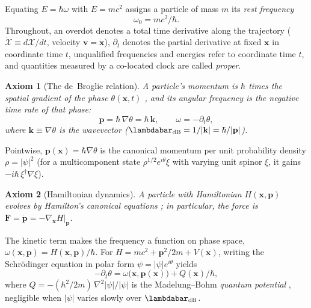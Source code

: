 \documentclass[aps,prd,onecolumn,tightenlines,nofootinbib,notitlepage,10pt,floatfix]{revtex4-2}
\theoremstyle{indentedtheorem}
\newtheorem{axiom}{Axiom}
\begin{document}
\noindent Equating $E=\hbar\omega$ with $E=mc^2$ \citep{Einstein1905Inertia} assigns a particle of mass $m$ its \emph{rest frequency}
\begin{equation}
    \omega_0 = mc^2/\hbar .
    \label{eq:rest_freq}
\end{equation}
Throughout, an overdot denotes a total time derivative along the trajectory ($\dot{\mathcal{X}}\equiv d\mathcal{X}/dt$, velocity $\mathbf{v}=\dot{\mathbf{x}}$), $\partial_t$ denotes the partial derivative at fixed $\mathbf{x}$ in coordinate time $t$, unqualified frequencies and energies refer to coordinate time $t$, and quantities measured by a co-located clock are called \emph{proper}.

\begin{axiom}[The de~Broglie relation]\label{ax:debroglie}
A particle's momentum is $\hbar$ times the spatial gradient of the phase $\theta(\mathbf{x},t)$ \citep{deBroglie1925Thesis}, and its angular frequency is the negative time rate of that phase:
\begin{equation}
    \mathbf{p} = \hbar \, \nabla\theta = \hbar\,\mathbf{k} , \qquad \omega = -\partial_t\theta ,
    \label{eq:debroglie}
\end{equation}
where $\mathbf{k}\equiv\nabla\theta$ is the wavevector ($\lambdabar_\mathrm{dB}=1/|\mathbf{k}|=\hbar/|\mathbf{p}|$).
\end{axiom}

\noindent Pointwise, $\mathbf{p}(\mathbf{x})=\hbar\nabla\theta$ is the canonical momentum per unit probability density $\rho=|\psi|^2$ (for a multicomponent state $\rho^{1/2}e^{i\theta}\xi$ with varying unit spinor $\xi$, it gains $-i\hbar\,\xi^\dagger\nabla\xi$).

\begin{axiom}[Hamiltonian dynamics]\label{ax:hamilton}
A particle with Hamiltonian $H(\mathbf{x},\mathbf{p})$ evolves by Hamilton's canonical equations \citep{Hamilton1835Second,Goldstein2002Classical}; in particular, the force is $\mathbf{F}=\dot{\mathbf{p}}=-\nabla_{\mathbf{x}}H|_{\mathbf{p}}$.
\end{axiom}

\noindent The kinetic term makes the frequency a function on phase space, $\omega(\mathbf{x},\mathbf{p})=H(\mathbf{x},\mathbf{p})/\hbar$. For $H=mc^2+\mathbf{p}^2/2m+V(\mathbf{x})$, writing the Schr\"odinger equation \citep{Schrodinger1926Quantization4} in polar form $\psi=|\psi|e^{i\theta}$ yields
\begin{equation}
    -\partial_t\theta = \omega\big(\mathbf{x},\mathbf{p}(\mathbf{x})\big) + Q(\mathbf{x})/\hbar ,
    \label{eq:phase_rate_split}
\end{equation}
where $Q=-(\hbar^2/2m)\,\nabla^2|\psi|/|\psi|$ is the Madelung--Bohm \emph{quantum potential} \citep{Madelung1927Quantentheorie,Bohm1952Suggested}, negligible when $|\psi|$ varies slowly over $\lambdabar_\mathrm{dB}$.
\end{document}
